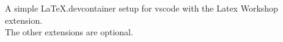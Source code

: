 \documentclass[sigplan,anonymous,review]{acmart}
\begin{document}
A simple \LaTeX \hspace{3pt}.devcontainer setup for vscode with the Latex Workshop extension.
\\ The other extensions are optional.
\end{document}
